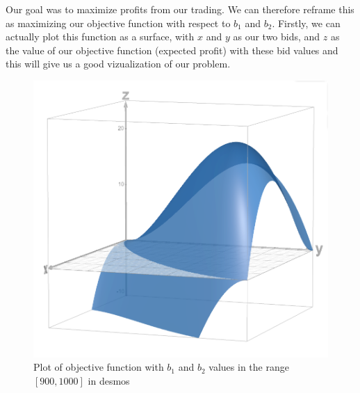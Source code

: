 \documentclass{article}
\begin{document}
Our goal was to maximize profits from our trading. We can therefore reframe this as maximizing our
objective function with respect to $b_1$ and $b_2$. Firstly, we can actually plot this function as a surface,
with $x$ and $y$ as our two bids, and $z$ as the value of our objective function (expected profit) with these
bid values and this will give us a good vizualization of our problem.

\begin{figure}[h!]
    \centering
    \includegraphics[scale = 0.4]{O(b_1, b_2) plot.png}
    \caption{Plot of objective function with $b_1$ and $b_2$ values in the range $[900,1000]$ in desmos}
\end{figure}
\end{document}
